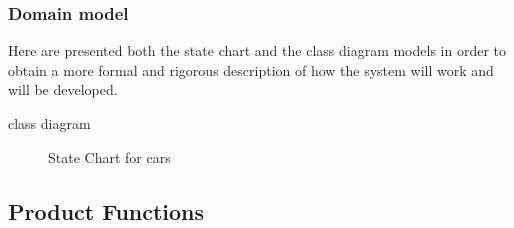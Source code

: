\documentclass[english]{article}
\begin{document}
\subsubsection{Domain model}

Here are presented both the state chart and the class diagram models in order to obtain a more formal and rigorous description of how the system will work and will be developed.

class diagram

\begin{figure}[H]
	\centering
	\caption{State Chart for cars}
	\label{statechart}
\end{figure}

\subsection{Product Functions}\label{goals}
\end{document}
